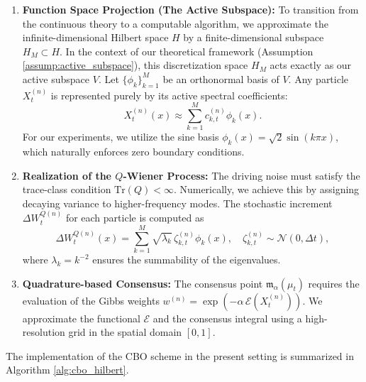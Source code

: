 \documentclass[12pt]{amsart}
\numberwithin{equation}{section}
\begin{document}
\begin{enumerate}[label = \arabic*.]
    \item \textbf{Function Space Projection (The Active Subspace):} To transition from the continuous theory to a computable algorithm, we approximate the infinite-dimensional Hilbert space $H$ by a finite-dimensional subspace $H_M \subset H$. In the context of our theoretical framework (Assumption \ref{assump:active_subspace}), this discretization space $H_M$ acts exactly as our active subspace $V$. Let $\{\phi_k\}_{k=1}^M$ be an orthonormal basis of $V$. Any particle $X_t^{(n)}$ is represented purely by its active spectral coefficients:
    \begin{equation*}
        X_t^{(n)}(x) \approx \sum_{k=1}^M c_{k,t}^{(n)} \phi_k(x).
    \end{equation*}
    For our experiments, we utilize the sine basis $\phi_k(x) = \sqrt{2}\sin(k \pi x)$, which naturally enforces zero boundary conditions.

    \item \textbf{Realization of the $Q$-Wiener Process:} The driving noise must satisfy the trace-class condition $\mathrm{Tr}(Q) < \infty$. Numerically, we achieve this by assigning decaying variance to higher-frequency modes. The stochastic increment $\Delta W_t^{Q(n)}$ for each particle is computed as 
    \begin{equation*}
        \Delta W_t^{Q(n)}(x) = \sum_{k=1}^M \sqrt{\lambda_k} \, \zeta_{k,t}^{(n)} \phi_k(x), \quad \zeta_{k,t}^{(n)} \sim \mathcal{N}(0, \Delta t),
    \end{equation*}
    where $\lambda_k = k^{-2}$ ensures the summability of the eigenvalues.

    \item \textbf{Quadrature-based Consensus:} The consensus point $\mathfrak{m}_{\alpha}(\mu_t)$ requires the evaluation of the Gibbs weights $w^{(n)} = \exp(-\alpha\, \mathscr{E}(X_t^{(n)}))$. We approximate the functional $\mathscr{E}$ and the consensus integral using a high-resolution grid in the spatial domain $[0, 1]$.
\end{enumerate}

The implementation of the CBO scheme in the present setting is summarized in Algorithm \ref{alg:cbo_hilbert}.
\end{document}
